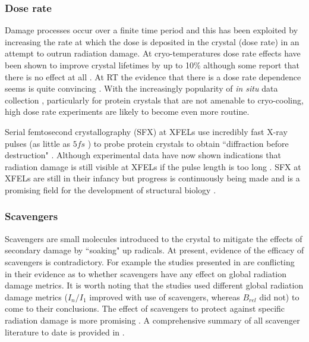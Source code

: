         \subsubsection{Dose rate}
        \label{subs:Dose rate}
            Damage processes occur over a finite time period and this has been exploited by increasing the rate at which the dose is deposited in the crystal (dose rate) in an attempt to outrun radiation damage.
			At cryo-temperatures dose rate effects have been shown to improve crystal lifetimes by up to 10\% \cite{owen2006} although some report that there is no effect at all \cite{sliz2003}.
			At RT the evidence that there is a dose rate dependence seems is quite convincing \cite{south2007,owen2012,owen2014}.
			With the increasingly popularity of \textit{in situ} data collection \cite{axford2015structure,axford2012situ}, particularly for protein crystals that are not amenable to cryo-cooling, high dose rate experiments are likely to become even more routine.

            Serial femtosecond crystallography (SFX) at XFELs use incredibly fast X-ray pulses (as little as $5 fs$ \cite{boutet2012high}) to probe protein crystals to obtain ``diffraction before destruction" \cite{chapman2014diffraction}.
			Although experimental data have now shown indications that radiation damage is still visible at XFELs if the pulse length is too long \cite{nass2015indications}.
			SFX at XFELs are still in their infancy but progress is continuously being made and is a promising field for the development of structural biology \cite{garman2014,brooks2015nobel}.


        \subsubsection{Scavengers}
        \label{subs:Scavengers}
            Scavengers are small molecules introduced to the crystal to mitigate the effects of secondary damage by ``soaking" up radicals.
			At present, evidence of the efficacy of scavengers is contradictory.
			For example the studies presented in \cite{barker2009room,kmetko2011can} are conflicting in their evidence as to whether scavengers have any effect on global radiation damage metrics.
			It is worth noting that the studies used different global radiation damage metrics ($I_n/I_1$ improved with use of scavengers, whereas $B_{rel}$ did not) to come to their conclusions.
			The effect of scavengers to protect against specific radiation damage is more promising \cite{southworth2007radioprotectant}.
			A comprehensive summary of all scavenger literature to date is provided in \cite{allan2012}.

